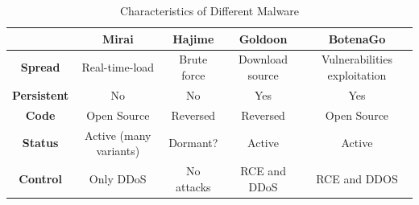 \begin{table}
	\centering
	\begin{tabular}{|c|c|c|c|c|}
		\hline
		 & \textbf{Mirai} & \textbf{Hajime} & \textbf{Goldoon} & \textbf{BotenaGo} \\
		\hline
		\textbf{Spread} & Real-time-load & Brute force & Download source & Vulnerabilities exploitation \\
		\hline
		\textbf{Persistent} & No & No & Yes & Yes \\
		\hline
		\textbf{Code} & Open Source & Reversed & Reversed & Open Source \\
		\hline
		\textbf{Status} & Active (many variants) & Dormant? & Active & Active \\
		\hline
		\textbf{Control} & Only DDoS & No attacks & RCE and DDoS & RCE and DDOS \\
		\hline
	\end{tabular}
	\caption{Characteristics of Different Malware}
	\label{tab:malware_characteristics}
\end{table}

